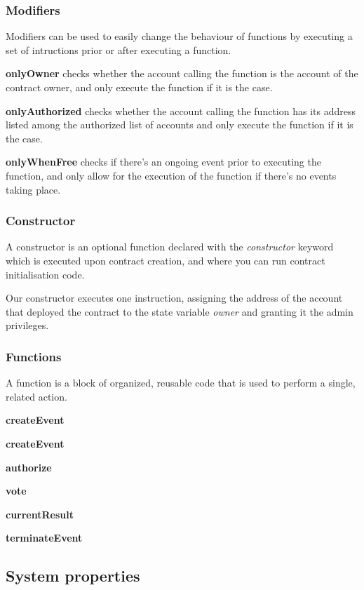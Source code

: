 \subsubsection{Modifiers}

Modifiers can be used to easily change the behaviour of functions by executing a set of intructions prior or after executing a function.

\begin{list}{}{}
\item \textbf{onlyOwner} checks whether the account calling the function is the account of the contract owner, and only execute the function if it is the case.
\item \textbf{onlyAuthorized} checks whether the account calling the function has its address listed among the authorized list of accounts and only execute the function if it is the case.
\item \textbf{onlyWhenFree} checks if there's an ongoing event prior to executing the function, and only allow for the execution of the function if there's no events taking place.
\end{list}

\subsubsection{Constructor}

A constructor is an optional function declared with the \textit{constructor} keyword which is executed upon contract creation, and where you can run contract initialisation code.

Our constructor executes one instruction, assigning the address of the account that deployed the contract to the state variable \textit{owner} and granting it the admin privileges.

\subsubsection{Functions}

A function is a block of organized, reusable code that is used to perform a single, related action.

\begin{list}{}{}
\item \textbf{createEvent}
\end{list}

\begin{list}{}{}
\item \textbf{createEvent}
\item \textbf{authorize}
\item \textbf{vote}
\item \textbf{currentResult}
\item \textbf{terminateEvent}
\end{list}

\subsection{System properties}
